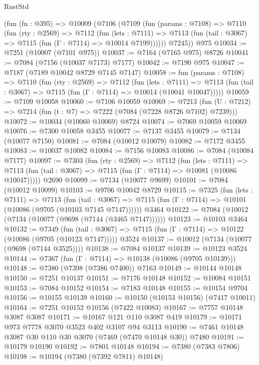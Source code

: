 \begin{lexlean}{RustStd}
\begin{coremodule}
    (fun (fn : @395) =>
    @10009
      (@7106
        (@7109
          (fun (params : @7108) =>
          @7110
            (fun (rty : @2569) =>
            @7112
              (fun (lets : @7111) =>
              @7113 (fun (tail : @3067) => @7115 (fun (Γ : @7114) => @10014 @7199))))))
        @7245))
    @975
@10034 := @7251 (@10007 (@7101 @975))
@10037 := @7164 (@7165 @975) @8726
@10041 := @7084 (@7156 (@10037 @7173) @7177)
@10042 := @7190 @975
@10047 := @7187 (@7189 @10042 @8729 @7145 @7147)
@10058 := fun (params : @7108) =>
  @7110
    (fun (rty : @2569) =>
    @7112
      (fun (lets : @7111) =>
      @7113 (fun (tail : @3067) => @7115 (fun (Γ : @7114) => @10014 (@10041 @10047)))))
@10059 := @7109 @10058
@10060 := @7106 @10059
@10069 := @7213 (fun (U : @7212) => @7214 (fun (t : @7) => @7222 (@7084 (@7228 @8726 @7102) @7239)))
@10072 := @10034 (@10060 @10069) @8724
@10074 := @7069 @10059 @10069
@10076 := @7300 @10058 @3455
@10077 := @7137 @3455
@10079 := @7134 (@10077 @7150)
@10081 := @7084 (@10012 @10079)
@10082 := @7172 @3455
@10083 := @10037 @10082
@10084 := @7156 @10083
@10086 := @7084 (@10084 @7177)
@10097 := @7303
    (fun (rty : @2569) =>
    @7112
      (fun (lets : @7111) =>
      @7113 (fun (tail : @3067) => @7115 (fun (Γ : @7114) => @10081 (@10086 @10047)))))
    @2690
@10099 := @7134 (@10077 @9699)
@10101 := @7084 (@10012 @10099)
@10103 := @9706 @10042 @8729
@10115 := @7325
    (fun (lets : @7111) =>
    @7113
      (fun (tail : @3067) =>
      @7115 (fun (Γ : @7114) => @10101 (@10086 (@9705 (@10103 @7145 @7147))))))
    @3464
@10122 := @7084 (@10012 (@7134 (@10077 (@9698 (@7144 (@3465 @7147))))))
@10123 := @10103 @3464
@10132 := @7349
    (fun (tail : @3067) => @7115 (fun (Γ : @7114) => @10122 (@10086 (@9705 (@10123 @7147)))))
    @3524
@10137 := @10012 (@7134 (@10077 (@9698 (@7144 @3525))))
@10138 := @7084 @10137
@10139 := @10123 @3524
@10144 := @7367 (fun (Γ : @7114) => @10138 (@10086 (@9705 @10139)))
@10148 := @7380 (@7398 (@7386 @7400)) @7163
@10149 := @10144 @10148
@10150 := @7251 @10137
@10151 := @7176 @10148
@10152 := @10084 @10151
@10153 := @7084 @10152
@10154 := @7183 @10148
@10155 := @10154 @9704
@10156 := @10155 @10139
@10160 := @10150 (@10153 @10156) (@7417 @10011)
@10164 := @7251 @10152 @10156 (@7422 @10083)
@10167 := @7757 @10148 @3087 @3087
@10171 := @10167 @121 @110 @3087 @419
@10179 := @10171 @973 @7778 @3070 @3523 @402 @3107 @94 @3113
@10190 := @7461 @10148 @3087 @30 @110 @30 @3070 (@7469 (@7470 @10148 @30)) @7480
@10191 := @10179 @10190
@10192 := @7801 @10148
@10194 := @7380 (@7383 @7806)
@10198 := @10194 (@7380 (@7392 @7811) @10148)

\end{coremodule}
\end{lexlean}
